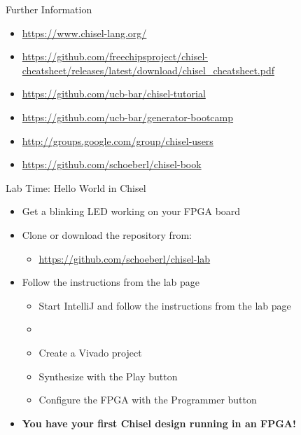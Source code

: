 \begin{frame}[fragile]{Further Information}
\begin{itemize}
\item \url{https://www.chisel-lang.org/}
\item \url{https://github.com/freechipsproject/chisel-cheatsheet/releases/latest/download/chisel_cheatsheet.pdf}
\item \url{https://github.com/ucb-bar/chisel-tutorial}
\item \url{https://github.com/ucb-bar/generator-bootcamp}
\item \url{http://groups.google.com/group/chisel-users}
\item \url{https://github.com/schoeberl/chisel-book}
\end{itemize}
\end{frame}


\begin{frame}[fragile]{Lab Time: Hello World in Chisel}
\begin{itemize}
\item Get a blinking LED working on your FPGA board
\item Clone or download the repository from:
\begin{itemize}
\item \url{https://github.com/schoeberl/chisel-lab}
\end{itemize}
\item Follow the instructions from the lab page
\begin{itemize}
\item Start IntelliJ and follow the instructions from the lab page
\item {}
\item Create a Vivado project
\item Synthesize with the Play button
\item Configure the FPGA with the Programmer button
\end{itemize}
\item {\bf You have your first Chisel design running in an FPGA!}
\end{itemize}
\end{frame}



